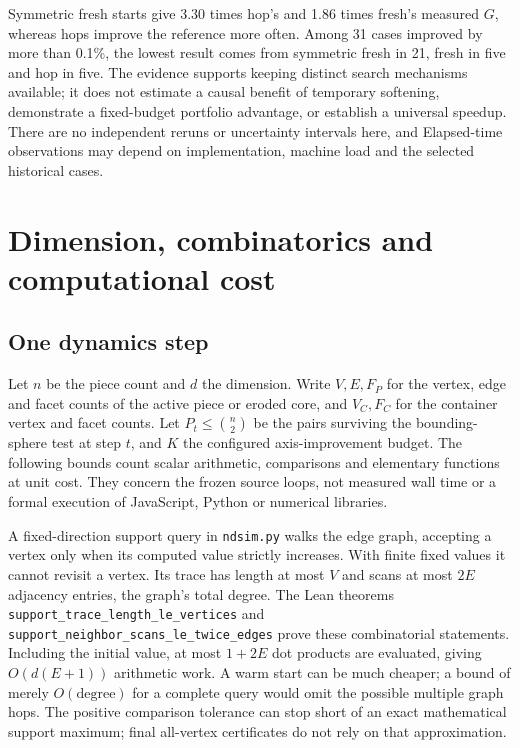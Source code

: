 \documentclass[11pt,a4paper]{article}
\newcommand{\code}[1]{\texttt{\nolinkurl{#1}}}
\begin{document}
Symmetric fresh starts give 3.30 times hop's and 1.86 times fresh's measured $G$, whereas hops improve the reference more often. Among 31 cases improved by more than 0.1\%, the lowest result comes from symmetric fresh in 21, fresh in five and hop in five. The evidence supports keeping distinct search mechanisms available; it does not estimate a causal benefit of temporary softening, demonstrate a fixed-budget portfolio advantage, or establish a universal speedup. There are no independent reruns or uncertainty intervals here, and Elapsed-time observations may depend on implementation, machine load and the selected historical cases.

\section{Dimension, combinatorics and computational cost}\label{sec:cost}
\subsection{One dynamics step}
Let $n$ be the piece count and $d$ the dimension. Write $V,E,F_P$ for the vertex, edge and facet counts of the active piece or eroded core, and $V_C,F_C$ for the container vertex and facet counts. Let $P_t\leq\binom n2$ be the pairs surviving the bounding-sphere test at step $t$, and $K$ the configured axis-improvement budget. The following bounds count scalar arithmetic, comparisons and elementary functions at unit cost. They concern the frozen source loops, not measured wall time or a formal execution of JavaScript, Python or numerical libraries.

A fixed-direction support query in \code{ndsim.py} walks the edge graph, accepting a vertex only when its computed value strictly increases. With finite fixed values it cannot revisit a vertex. Its trace has length at most $V$ and scans at most $2E$ adjacency entries, the graph's total degree. The Lean theorems \code{support_trace_length_le_vertices} and \code{support_neighbor_scans_le_twice_edges} prove these combinatorial statements. Including the initial value, at most $1+2E$ dot products are evaluated, giving $O(d(E+1))$ arithmetic work. A warm start can be much cheaper; a bound of merely $O(\mathrm{degree})$ for a complete query would omit the possible multiple graph hops. The positive comparison tolerance can stop short of an exact mathematical support maximum; final all-vertex certificates do not rely on that approximation.
\end{document}
